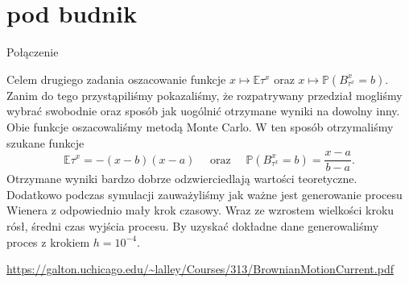 \documentclass[12pt]{mwart}
\begin{document}
	
	
	\section{pod budnik}
	
	
	Połączenie
	
	\noindent Celem drugiego zadania oszacowanie funkcje $x\mapsto\mathbb{E}\tau^x$ oraz $x\mapsto\mathbb{P}\left(B^x_{\tau^x}=b\right)$.
	Zanim do tego przystąpiliśmy pokazaliśmy, że rozpatrywany przedział mogliśmy wybrać swobodnie oraz sposób jak uogólnić otrzymane wyniki na dowolny inny. Obie funkcje oszacowaliśmy metodą Monte Carlo. W ten sposób otrzymaliśmy szukane funkcje
	\begin{equation*}
		\mathbb{E}\tau^x=-(x-b)(x-a)\quad\text{ oraz }\quad\mathbb{P}\left(B^x_{\tau^x}=b\right)=\frac{x-a}{b-a}.
	\end{equation*}
	Otrzymane wyniki bardzo dobrze odzwierciedlają wartości teoretyczne.\vspace{1.5mm}\\
	\noindent Dodatkowo podczas symulacji zauważyliśmy jak ważne jest generowanie procesu Wienera z odpowiednio mały krok czasowy. Wraz ze wzrostem wielkości kroku rósł, średni czas wyjścia procesu. By uzyskać dokładne dane generowaliśmy proces z krokiem $h=10^{-4}$.
	
	
	
	
	
	
	\newpage
	\begin{thebibliography}{1}
		\url{https://galton.uchicago.edu/~lalley/Courses/313/BrownianMotionCurrent.pdf}
	\end{thebibliography}
\end{document}
